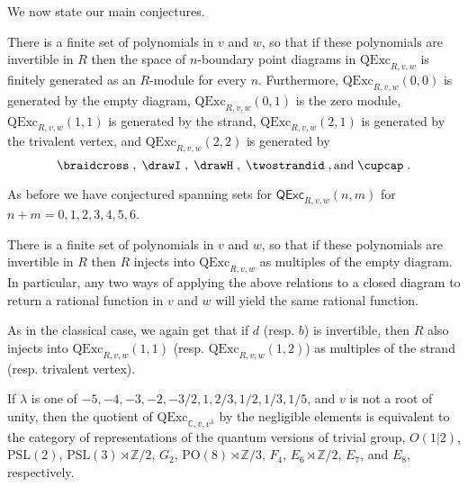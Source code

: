 \documentclass[12pt]{amsart}
\begin{document}
We now state our main conjectures.

\begin{conjecture}
  \label{conj:quant-suffic}
There is a finite set of polynomials in $v$ and $w$, so that if these polynomials are invertible in $R$ then the space of $n$-boundary point diagrams in $\mathrm{QExc}_{R,v,w}$ is finitely generated as an $R$-module for every $n$.  Furthermore, $\mathrm{QExc}_{R,v,w}(0,0)$ is generated by the empty diagram, $\mathrm{QExc}_{R,v,w}(0,1)$ is the zero module, $\mathrm{QExc}_{R,v,w}(1,1)$ is generated by the strand,  $\mathrm{QExc}_{R,v,w}(2,1)$ is generated by the trivalent vertex, and $\mathrm{QExc}_{R,v,w}(2,2)$ is generated by
$$\braidcross\;, \; \drawI \;, \; \drawH \;, \; \twostrandid \;, \text{and} \; \cupcap \; .$$
\end{conjecture}


As before we have conjectured spanning sets for $\mathsf{QExc}_{R,v,w}(n,m)$ for $n+m=0,1,2,3,4,5,6$.

\begin{conjecture}
  \label{conj:quant-consist}
There is a finite set of polynomials in $v$ and $w$, so that if these polynomials are invertible in $R$ then $R$ injects into $\mathrm{QExc}_{R,v,w}$ as multiples of the empty diagram.  In particular, any two ways of applying the above relations to a closed diagram to return a rational function in $v$ and $w$ will yield the same rational function.
\end{conjecture}


As in the classical case, we again get that if $d$ (resp. $b$) is invertible, then $R$ also injects into $\mathrm{QExc}_{R,v,w}(1,1)$ (resp. $\mathrm{QExc}_{R,v,w}(1,2)$) as multiples of the strand (resp. trivalent vertex).

\begin{conjecture}
If $\lambda$ is one  of $-5, -4, -3, -2, -3/2,1,2/3,1/2, 1/3, 1/5$, and $v$ is not a root of unity, then the quotient of $\mathrm{QExc}_{\mathbb{C},v,v^\lambda}$ by the negligible elements is equivalent to the category of representations of the quantum versions of trivial group, $O(1 | 2)$, $\mathrm{PSL}(2)$, $\mathrm{PSL}(3) \rtimes \mathbb{Z}/2$, $G_2$, $\mathrm{PO}(8) \rtimes \mathbb{Z}/3$, $F_4$, $E_6 \rtimes \mathbb{Z}/2$, $E_7$, and $E_8$, respectively.
\end{conjecture}
\end{document}

